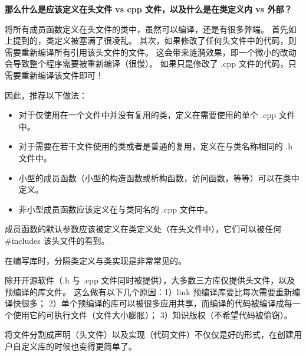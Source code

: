 \documentclass[../../LearnCpp.tex]{subfiles}
\begin{document}
\textbf{那么什么是应该定义在头文件 vs cpp 文件，以及什么是在类定义内 vs 外部？}

将所有成员函数定义在头文件的类中，虽然可以编译，还是有很多弊端。
首先如上提到的，类定义被塞满了很凌乱。
其次，如果修改了任何头文件中的代码，则需要重新编译所有引用该头文件的文件。
这会带来涟漪效果，即一个微小的改动会导致整个程序需要被重新编译（很慢）。
如果只是修改了 .cpp 文件的代码，只需要重新编译该文件即可！

因此，推荐以下做法：

\begin{itemize}
    \item 对于仅使用在一个文件中并没有复用的类，定义在需要使用的单个 .cpp 文件中。
    \item 对于需要在若干文件使用的类或者是普通的复用，定义在与类名称相同的 .h 文件中。
    \item 小型的成员函数（小型的构造函数或析构函数，访问函数，等等）可以在类中定义。
    \item 非小型成员函数应该定义在与类同名的 .cpp 文件中。
\end{itemize}

成员函数的默认参数应该被定义在类定义处（在头文件中），它们可以被任何 \#includes 该头文件的看到。

在编写库时，分隔类定义与类实现是非常常见的。

除开开源软件（.h 与 .cpp 文件同时被提供），大多数三方库仅提供头文件，以及预编译的库文件。
这么做有以下几个原因：1）link 预编译库要比每次需要重新编译快很多；
2）单个预编译的库可以被很多应用共享，而编译的代码被编译成每一个使用它的可执行文件（文件大小膨胀）；
3）知识版权（不希望代码被偷窃）。

将文件分割成声明（头文件）以及实现（代码文件）不仅仅是好的形式，在创建用户自定义库的时候也变得更简单了。
\end{document}
